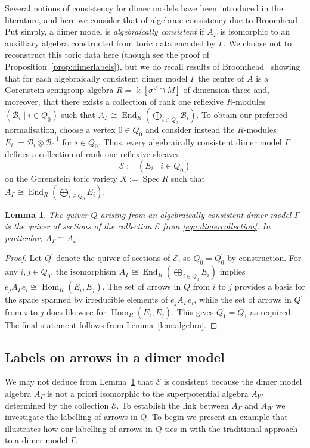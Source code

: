 \documentclass[11pt,a4paper]{amsart}
\numberwithin{equation}{section}
\newtheorem{lemma}[theorem]{Lemma}
\theoremstyle{definition}
\theoremstyle{remark}
\newcommand{\kk}{\ensuremath{\Bbbk}}
\newcommand{\End}{\operatorname{End}}
\newcommand{\Hom}{\operatorname{Hom}}
\newcommand{\Spec}{\operatorname{Spec}}
\begin{document}
 Several notions of consistency for dimer models have been introduced in the literature, and here we consider that of algebraic consistency due to Broomhead~\cite{Broomhead}.  Put simply, a dimer model is \emph{algebraically consistent} if $A_\Gamma$ is isomorphic to an auxilliary algebra constructed from toric data encoded by $\Gamma$. We choose not to reconstruct this toric data here (though see the proof of Proposition~\ref{prop:dimerlabels}), but we do recall results of Broomhead~\cite{Broomhead} showing that for each algebraically consistent dimer model $\Gamma$ the centre of $A$ is a Gorenstein semigroup algebra $R=\kk[\sigma^\vee\cap M]$ of dimension three and, moreover, that there exists a collection of rank one reflexive $R$-modules $(\mathcal{B}_i \mid i\in Q_0)$ such that $A_\Gamma \cong \End_{R}(\bigoplus_{i\in Q_0} \mathcal{B}_i)$. To obtain our preferred normalisation, choose a vertex $0\in Q_0$ and consider instead the $R$-modules $E_i:= \mathcal{B}_i\otimes \mathcal{B}_0^{-1}$ for $i\in Q_0$. Thus, every algebraically consistent dimer model $\Gamma$ defines a collection of rank one reflexive sheaves
 \begin{equation}
 \label{eqn:dimercollection}
 \mathscr{E}:=(E_i \mid i\in Q_0)
 \end{equation} 
 on the Gorenstein toric variety $X:=\Spec R$ such that $A_\Gamma \cong \End_{R}(\bigoplus_{i\in Q_0} E_i)$. 

  \begin{lemma}
  \label{lem:dimerqos}
 The quiver $Q$ arising from an algebraically consistent dimer model $\Gamma$ is the quiver of sections of the collection $\mathscr{E}$ from \eqref{eqn:dimercollection}. In particular, $A_\Gamma\cong A_\mathscr{E}$. 
 \end{lemma}
\begin{proof}
 Let $Q^\prime$ denote the quiver of sections of $\mathscr{E}$, so $Q_0=Q_0^\prime$ by construction. For any $i,j\in Q_0$, the isomorphism $A_\Gamma \cong \End_{R}(\bigoplus_{i\in Q_0} E_i)$ implies $e_jA_\Gamma e_i \cong \Hom_R(E_i,E_j)$. The set of arrows in $Q$ from $i$ to $j$ provides a basis for the space spanned by irreducible elements of $e_jA_\Gamma e_i$, while the set of arrows in $Q^\prime$ from $i$ to $j$ does likewise for $\Hom_R(E_i,E_j)$. This gives $Q_1^\prime = Q_1$ as required.  The final statement follows from Lemma~\ref{lem:algebra}.
 \end{proof}

  \subsection{Labels on arrows in a dimer model}
We may not deduce from Lemma~\ref{lem:dimerqos} that $\mathscr{E}$ is consistent because the dimer model algebra $A_\Gamma$ is not a priori isomorphic to the superpotential algebra $A_W$ determined by the collection $\mathscr{E}$. To establish the link between $A_\Gamma$ and $A_W$ we investigate the labelling of arrows in $Q$.  To begin we present an example that illustrates how our labelling of arrows in $Q$ ties in with the traditional approach to a dimer model $\Gamma$.
   
\end{document}
